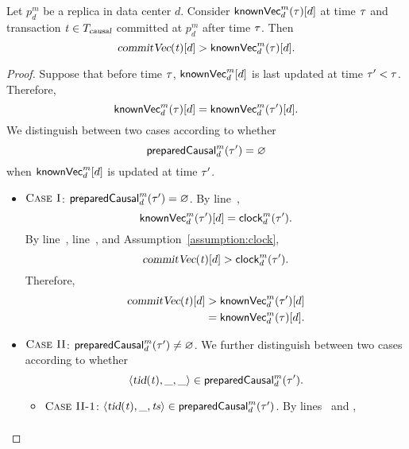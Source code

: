 \begin{applemma} \label{lemma:knownvc-commitvc-d}
  Let $p^{m}_{d}$ be a replica in data center $d$.
  Consider ${\sf knownVec}^{m}_{d}(\tau)[d]$ at time $\tau$
  and transaction $\mathit{t} \in T_{\textsl{causal}}$ committed at $p^{m}_{d}$
  after time $\tau$. Then
  \[
    \textsl{commitVec}(\mathit{t})[d] > {\sf knownVec}^{m}_{d}(\tau)[d].
  \]
\end{applemma}

\begin{proof} \label{proof:knownvc-commitvc-d}
  Suppose that before time $\tau$,
  ${\sf knownVec}^{m}_{d}[d]$ is last updated at time $\tau' < \tau$.
  Therefore,
  \[
    {\sf knownVec}^{m}_{d}(\tau)[d] = {\sf knownVec}^{m}_{d}(\tau')[d].
  \]
  We distinguish between two cases according to whether
  \[
    {\sf preparedCausal}^{m}_{d}(\tau') = \varnothing
  \]
  when ${\sf knownVec}^{m}_{d}[d]$ is updated at time $\tau'$.
  \begin{itemize}
    \item $\textsc{Case I}$: ${\sf preparedCausal}^{m}_{d}(\tau') = \varnothing$.
      By line~\code{\ref{alg:unistore-replication}}{\ref{line:propagate-knownvc-clock}},
      \[
        {\sf knownVec}^{m}_{d}(\tau')[d] = {\sf clock}^{m}_{d}(\tau').
      \]
      By line~\code{\ref{alg:unistore-replica}}{\ref{line:preparecausal-ts}},
      line~\code{\ref{alg:unistore-coord}}{\ref{line:commitcausal-commitvc-d}},
      and Assumption~\ref{assumption:clock},
      \[
        \textsl{commitVec}(\mathit{t})[d] > {\sf clock}^{m}_{d}(\tau').
      \]
      Therefore,
      \begin{align*}
        \textsl{commitVec}(\mathit{t})[d] &> {\sf knownVec}^{m}_{d}(\tau')[d] \\
                          &= {\sf knownVec}^{m}_{d}(\tau)[d].
      \end{align*}
    \item $\textsc{Case II}$: ${\sf preparedCausal}^{m}_{d}(\tau') \neq \varnothing$.
      We further distinguish between two cases according to whether
      \[
        \langle \textsl{tid}(\mathit{t}), \_, \_ \rangle \in {\sf preparedCausal}^{m}_{d}(\tau').
      \]
      \begin{itemize}
        \item $\textsc{Case II-1}$:
          $\langle \textsl{tid}(\mathit{t}), \_, \mathit{ts} \rangle \in {\sf preparedCausal}^{m}_{d}(\tau')$.
          By lines~\code{\ref{alg:unistore-replication}}{\ref{line:propagate-knownvc-ts}}
          and \code{\ref{alg:unistore-coord}}{\ref{line:commitcausal-commitvc-d}},
          \begin{align*}

\end{align*}
\end{itemize}
\end{itemize}
\end{proof}
